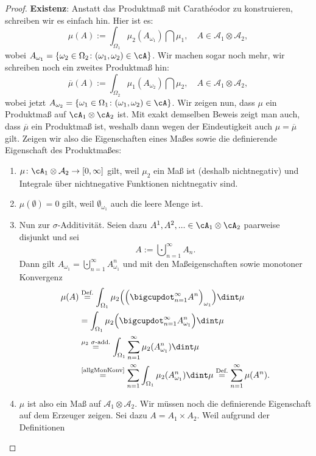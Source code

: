 \begin{proof}
			
	\textbf{Existenz}: Anstatt das Produktma\ss{} mit Carath\'eodor zu konstruieren, schreiben wir es einfach hin. Hier ist es:	
	\[ \mu(A) := \int_{\Omega_1} \mu_2(A_{\omega_1}) \dint \mu_1,\quad A\in \mathcal A_1\otimes \mathcal A_2, \]
		wobei $A_{\omega_1} = \{ \omega_2 \in \Omega_2 \colon (\omega_1,\omega_2) \in \cA \}$.
	 Wir machen sogar noch mehr, wir schreiben noch ein zweites Produktma\ss{} hin:
	  \[ \overline{\mu}(A) := \int_{\Omega_2} \mu_1(A_{\omega_2}) \dint \mu_2,\quad A\in \mathcal A_1\otimes \mathcal A_2, \]
	wobei jetzt $A_{\omega_2} = \{ \omega_1 \in \Omega_1 \colon (\omega_1,\omega_2) \in \cA \}$. Wir zeigen nun, dass $\mu$ ein Produktmaß auf $\cA_1 \otimes \cA_2$ ist. Mit exakt demselben Beweis zeigt man auch, dass $\overline{\mu}$ ein Produktma\ss{} ist, weshalb dann wegen der Eindeutigkeit auch $\mu=\overline{\mu}$ gilt. Zeigen wir also die Eigenschaften eines Ma\ss es sowie die definierende Eigenschaft des Produktma\ss es:
			\begin{enumerate}[label=(\roman*)]
		\item $\mu\colon \cA_1\otimes \mathcal A_2 \to [0, \infty]$ gilt, weil $\mu_2$ ein Maß ist (deshalb nichtnegativ) und Integrale über nichtnegative Funktionen nichtnegativ sind.
		\item $\mu(\emptyset) = 0$ gilt, weil $\emptyset_{\omega_1}$ auch die leere Menge ist.
		\item Nun zur $\sigma$-Additivität. Seien dazu $A^1,A^2,...\in \cA_1\otimes \cA_2$ paarweise disjunkt und sei
		\[ A:= \bigcupdot_{n=1}^{\infty} A_n.\]
		Dann gilt $A_{\omega_1} = \bigcupdot_{n=1}^{\infty} A_{\omega_1}^n$ und mit den Ma\ss eigenschaften sowie monotoner Konvergenz
		\begin{align*}
		\mu(A)&\overset{\text{Def.}}{=} \int_{\Omega_1} \mu_2\Big(\Big(\bigcupdot_{n=1}^{\infty} A^n\Big)_{\omega_1}\Big) \dint \mu\\
		& = \int_{\Omega_1} \mu_2\Big(\bigcupdot_{n=1}^{\infty} A_{\omega_1}^n\Big) \dint \mu\\
		&\overset{\mu_2 \text{ $\sigma$-add.}}{=} 
		\int_{\Omega_1} \sum\limits_{n=1}^{\infty}\mu_2(A_{\omega_1}^n) \dint \mu\\ 
		&\overset{\text{\ref{allgMonKonv}}}{=} \sum\limits_{n=1}^{\infty} \int_{\Omega_1} \mu_2(A_{\omega_1}^n) \dint \mu \overset{\text{Def.}}{=} \sum\limits_{n=1}^{\infty} \mu(A^n).
		\end{align*}
	\item	$\mu$ ist also ein Ma\ss{} auf $\mathcal A_1\otimes \mathcal A_2$. Wir m\"ussen noch die definierende Eigenschaft auf dem Erzeuger zeigen. Sei dazu $A = A_1 \times A_2$. Weil aufgrund der Definitionen	

\end{enumerate}
\end{proof}
